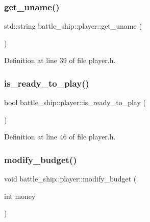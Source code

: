 \subsubsection{\texorpdfstring{get\+\_\+uname()}{get\_uname()}}
{\footnotesize\ttfamily std\+::string battle\+\_\+ship\+::player\+::get\+\_\+uname (\begin{DoxyParamCaption}{ }\end{DoxyParamCaption})\hspace{0.3cm}{\ttfamily [inline]}}



Definition at line 39 of file player.\+h.

\mbox{\label{classbattle__ship_1_1player_af5373e08a637e9c21b3751eb02e07540}} 
\subsubsection{\texorpdfstring{is\+\_\+ready\+\_\+to\+\_\+play()}{is\_ready\_to\_play()}}
{\footnotesize\ttfamily bool battle\+\_\+ship\+::player\+::is\+\_\+ready\+\_\+to\+\_\+play (\begin{DoxyParamCaption}{ }\end{DoxyParamCaption})\hspace{0.3cm}{\ttfamily [inline]}}



Definition at line 46 of file player.\+h.

\mbox{\label{classbattle__ship_1_1player_ade02279db7265558659c40f16c482df7}} 
\subsubsection{\texorpdfstring{modify\+\_\+budget()}{modify\_budget()}}
{\footnotesize\ttfamily void battle\+\_\+ship\+::player\+::modify\+\_\+budget (\begin{DoxyParamCaption}\item[{int}]{money }\end{DoxyParamCaption})\hspace{0.3cm}{\ttfamily [inline]}}



